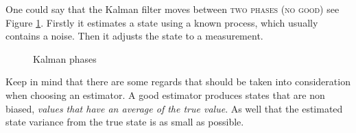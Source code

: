 \documentclass[a4paper,11pt]{kth-mag}
\begin{document}
One could say that the Kalman filter moves between \textsc{two phases (no good)} see Figure \ref{Fig: Kalman phases}. Firstly it estimates a state using a known process, which usually contains a noise. Then it adjusts the state to a measurement.

\begin{figure}
\centering

\caption{Kalman phases}
\label{Fig: Kalman phases}
\end{figure}

Keep in mind that there are some regards that should be taken into consideration when choosing an estimator.
A good estimator produces states that are non biased, \emph{values that have an average  of the true value}. As well that the estimated state variance from the true state is as small as possible\cite{Simon2001}.
\end{document}
